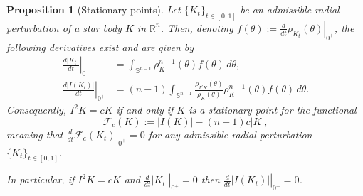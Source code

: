 \documentclass[11pt]{article}
\newtheorem{prop}[thm]{Proposition}
\theoremstyle{definition}
\theoremstyle{proof}
\newcommand{\dt}[1]{\left . \frac{d}{dt} #1 \right |_{0^+}}
\newcommand{\dht}[1]{\left . \frac{d#1}{dt}\right |_{0^+}}
\DeclareMathOperator{\+}{\mathop{\tilde{+}}}
\newcommand{\R}{\mathbb{R}}
\renewcommand{\S}{\mathbb{S}}
\newcommand{\F}{\mathcal{F}}
\numberwithin{equation}{section}
\numberwithin{equation}{section}
\begin{document}
\begin{prop}[Stationary points] \label{prop:stationary}
Let $\{K_t\}_{t \in [0,1]}$ be an admissible radial perturbation of a star body $K$ in $\R^n$. Then, denoting $f(\theta) := \dt{\rho_{K_t}(\theta)}$, the following derivatives exist and are given by
\begin{align*}
\dht{|K_t|} & = \int_{\S^{n-1}} \rho_{K}^{n-1}(\theta) f(\theta) \, d\theta , \\
\dht{|I(K_t)|} & = (n-1) \int_{\S^{n-1}} \frac{\rho_{I^2 K}(\theta)}{\rho_K(\theta)} \rho_{K}^{n-1}(\theta) f(\theta)  \, d\theta .  
 \end{align*}
 Consequently, $I^2 K = c K$ if and only if $K$ is a stationary point for the functional
 \[
 \F_c(K) := |I(K)| - (n-1) c |K|,
 \]
 meaning that $\dt{\F_c(K_t)}  = 0$ for any admissible radial perturbation $\{K_t\}_{t \in [0,1]}$. 
 
 \noindent
 In particular, if $I^2 K = c K$ and $\dt{|K_t|} = 0$ then $\dt{|I(K_t)|}=0$. 
\end{prop}
\end{document}

